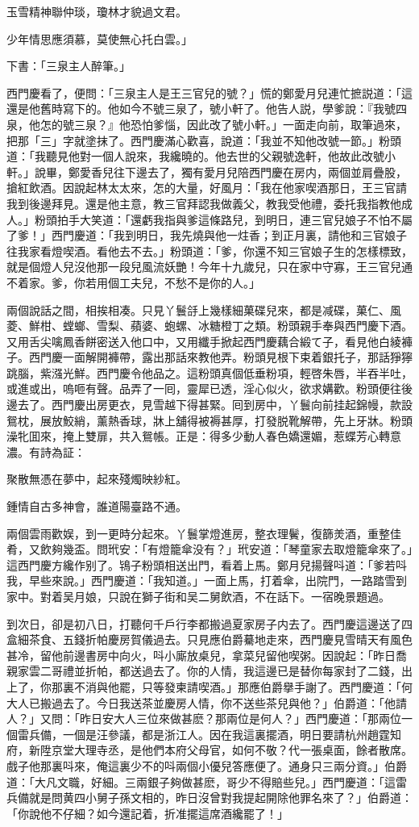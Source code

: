 玉雪精神聯仲琰，瓊林才貌過文君。

少年情思應須慕，莫使無心托白雲。」

下書：「三泉主人醉筆。」

西門慶看了，便問：「三泉主人是王三官兒的號？」慌的鄭愛月兒連忙摭説道：「這還是他舊時寫下的。他如今不號三泉了，號小軒了。他告人説，學爹說：『我號四泉，他怎的號三泉？』他恐怕爹惱，因此改了號小軒。」一面走向前，取筆過來，把那「三」字就塗抹了。西門慶滿心歡喜，說道：「我並不知他改號一節。」粉頭道：「我聽見他對一個人說來，我纔曉的。他去世的父親號逸軒，他故此改號小軒。」說畢，鄭愛香兒往下邊去了，獨有愛月兒陪西門慶在房内，兩個並肩疊股，搶紅飲酒。因說起林太太來，怎的大量，好風月：「我在他家喫酒那日，王三官請我到後邊拜見。還是他主意，教三官拜認我做義父，教我受他禮，委托我指教他成人。」粉頭拍手大笑道：「還虧我指與爹這條路兒，到明日，連三官兒娘子不怕不屬了爹！」西門慶道：「我到明日，我先燒與他一炷香；到正月裏，請他和三官娘子往我家看燈喫酒。看他去不去。」粉頭道：「爹，你還不知三官娘子生的怎樣標致，就是個燈人兒沒他那一段兒風流妖艷！今年十九歲兒，只在家中守寡，王三官兒通不着家。爹，你若用個工夫兒，不愁不是你的人。」

兩個說話之間，相挨相凑。只見丫鬟㧱上幾樣細菓碟兒來，都是减碟，菓仁、風菱、鮮柑、螳螂、雪梨、蘋婆、蚫螺、冰糖橙丁之類。粉頭親手奉與西門慶下酒。又用舌尖噙鳳香餅密送入他口中，又用纖手掀起西門慶藕合緞て子，看見他白綾褲子。西門慶一面解開褲帶，露出那話來教他弄。粉頭見根下束着銀托子，那話猙獰跳腦，紫漒光鮮。西門慶令他品之。這粉頭真個低垂粉項，輕啓朱唇，半吞半吐，或進或出，嗚咂有聲。品弄了一囘，靈犀已透，淫心似火，欲求媾歡。粉頭便往後邊去了。西門慶出房更衣，見雪越下得甚緊。囘到房中，丫鬟向前挂起錦幔，款設鴛枕，展放鮫綃，薰熱香球，牀上舖得被褥甚厚，打發脱靴解帶，先上牙牀。粉頭澡牝囬來，掩上雙扉，共入鴛帳。正是：得多少動人春色嬌還媚，惹蝶芳心轉意濃。有詩為証：

聚散無憑在夢中，起來殘燭映紗紅。

鍾情自古多神會，誰道陽臺路不通。

兩個雲雨歡娱，到一更時分起來。丫鬟掌燈進房，整衣理鬢，復篩羙酒，重整佳肴，又飲夠幾盃。問玳安：「有燈籠傘没有？」玳安道：「琴童家去取燈籠傘來了。」這西門慶方纔作别了。鴇子粉頭相送出門，看着上馬。鄭月兒揚聲呌道：「爹若呌我，早些來說。」西門慶道：「我知道。」一面上馬，打着傘，出院門，一路踏雪到家中。對着吴月娘，只說在獅子街和吴二舅飲酒，不在話下。一宿晚景題過。

到次日，卻是初八日，打聽何千戶行李都搬過夏家房子内去了。西門慶這邊送了四盒細茶食、五錢折帕慶房賀儀過去。只見應伯爵驀地走來，西門慶見雪晴天有風色甚冷，留他前邊書房中向火，呌小廝放桌兒，拿菜兒留他喫粥。因說起：「昨日喬親家雲二哥禮並折帕，都送過去了。你的人情，我這邊已是替你每家封了二錢，出上了，你那裏不消與他罷，只等發柬請喫酒。」那應伯爵擧手謝了。西門慶道：「何大人已搬過去了。今日我送茶並慶房人情，你不送些茶兒與他？」伯爵道：「他請人？」又問：「昨日安大人三位來做甚麽？那兩位是何人？」西門慶道：「那兩位一個雷兵備，一個是汪參議，都是浙江人。因在我這裏擺酒，明日要請杭州趙霆知府，新陞京堂大理寺丞，是他們本府父母官，如何不敬？代一張桌面，餘者散席。戲子他那裏呌來，俺這裏少不的呌兩個小優兒答應便了。通身只三兩分資。」伯爵道：「大凡文職，好細。三兩銀子夠做甚麽，哥少不得賠些兒。」西門慶道：「這雷兵備就是問黄四小舅子孫文相的，昨日沒曾對我提起開除他罪名來了？」伯爵道：「你說他不仔細？如今還記着，折准擺這席酒纔罷了！」


